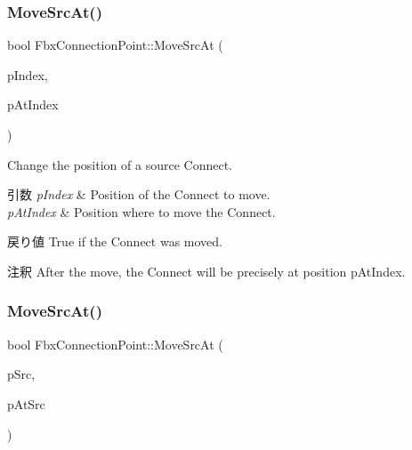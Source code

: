 \mbox{\label{class_fbx_connection_point_abc82c5b4c5c5c9b1d4ab59662cb13e7e}} 
\subsubsection{\texorpdfstring{Move\+Src\+At()}{MoveSrcAt()}\hspace{0.1cm}{\footnotesize\ttfamily [1/2]}}
{\footnotesize\ttfamily bool Fbx\+Connection\+Point\+::\+Move\+Src\+At (\begin{DoxyParamCaption}\item[{int}]{p\+Index,  }\item[{int}]{p\+At\+Index }\end{DoxyParamCaption})}

Change the position of a source Connect. 
\begin{DoxyParams}{引数}
{\em p\+Index} & Position of the Connect to move. \\
\hline
{\em p\+At\+Index} & Position where to move the Connect. \\
\hline
\end{DoxyParams}
\begin{DoxyReturn}{戻り値}
{\ttfamily True} if the Connect was moved. 
\end{DoxyReturn}
\begin{DoxyRemark}{注釈}
After the move, the Connect will be precisely at position p\+At\+Index. 
\end{DoxyRemark}
\mbox{\label{class_fbx_connection_point_a23302c72f75632bec8b48f3f3fe8e783}} 
\subsubsection{\texorpdfstring{Move\+Src\+At()}{MoveSrcAt()}\hspace{0.1cm}{\footnotesize\ttfamily [2/2]}}
{\footnotesize\ttfamily bool Fbx\+Connection\+Point\+::\+Move\+Src\+At (\begin{DoxyParamCaption}\item[{\hyperlink{class_fbx_connection_point}{Fbx\+Connection\+Point} $\ast$}]{p\+Src,  }\item[{\hyperlink{class_fbx_connection_point}{Fbx\+Connection\+Point} $\ast$}]{p\+At\+Src }\end{DoxyParamCaption})}

